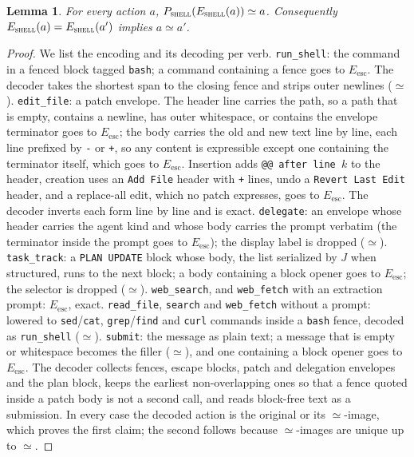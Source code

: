 \documentclass{article} %
\newtheorem{lemma}{Lemma}
\begin{document}
\begin{lemma}\label{lem:shell}
For every action $a$,
$P_{\textup{\textsc{shell}}}(E_{\textup{\textsc{shell}}}(a))\simeq a$. Consequently
$E_{\textup{\textsc{shell}}}(a)=E_{\textup{\textsc{shell}}}(a')$ implies $a\simeq a'$.
\end{lemma}
\begin{proof}
We list the encoding and its decoding per verb.
\texttt{run\_shell}: the command in a fenced block tagged \texttt{bash}; a
command containing a fence goes to $E_{\mathrm{esc}}$. The decoder takes the
shortest span to the closing fence and strips outer newlines ($\simeq$).
\texttt{edit\_file}: a patch envelope. The header line carries the path, so a
path that is empty, contains a newline, has outer whitespace, or contains the
envelope terminator goes to $E_{\mathrm{esc}}$; the body carries the old and
new text line by line, each line prefixed by \texttt{-} or \texttt{+}, so any
content is expressible except one containing the terminator itself, which
goes to $E_{\mathrm{esc}}$. Insertion adds \texttt{@@ after line $k$} to the
header, creation uses an \texttt{Add File} header with \texttt{+} lines,
undo a \texttt{Revert Last Edit} header, and a replace-all edit, which no patch
expresses, goes to $E_{\mathrm{esc}}$. The decoder inverts each form line by
line and is exact. \texttt{delegate}: an envelope whose header carries the
agent kind and whose body carries the prompt verbatim (the terminator inside
the prompt goes to $E_{\mathrm{esc}}$); the display label is dropped
($\simeq$). \texttt{task\_track}: a \texttt{PLAN UPDATE} block whose body,
the list serialized by $J$ when structured, runs to the next block; a body
containing a block opener goes to $E_{\mathrm{esc}}$; the selector is dropped
($\simeq$). \texttt{web\_search}, and \texttt{web\_fetch} with an extraction
prompt: $E_{\mathrm{esc}}$, exact. \texttt{read\_file}, \texttt{search} and
\texttt{web\_fetch} without a prompt: lowered to \texttt{sed}/\texttt{cat},
\texttt{grep}/\texttt{find} and \texttt{curl} commands inside a \texttt{bash}
fence, decoded as \texttt{run\_shell} ($\simeq$). \texttt{submit}: the message
as plain text; a message that is empty or whitespace becomes the filler
($\simeq$), and one containing a block opener goes to $E_{\mathrm{esc}}$. The
decoder collects fences, escape blocks, patch and delegation envelopes and the
plan block, keeps the earliest non-overlapping ones so that a fence quoted
inside a patch body is not a second call, and reads block-free text as a
submission. In every case the decoded action is the original or its
$\simeq$-image, which proves the first claim; the second follows because
$\simeq$-images are unique up to $\simeq$.
\end{proof}
\end{document}
